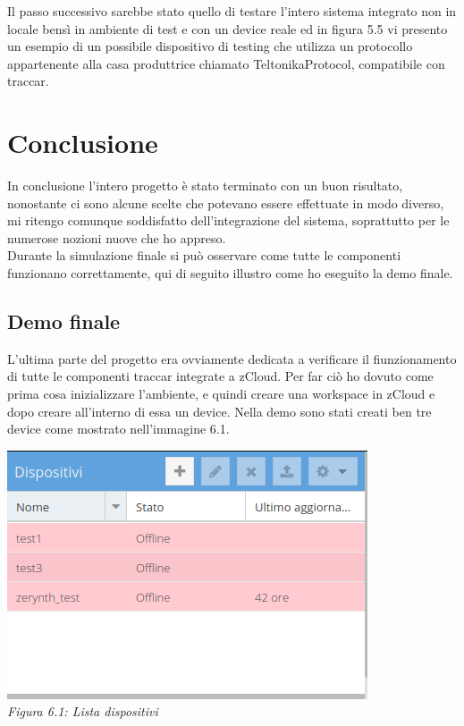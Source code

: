 \documentclass[a4paper,titlepage,12pt]{book}
\begin{document}
Il passo successivo sarebbe stato quello di testare l'intero sistema integrato non in locale bensì in ambiente di test e con un device reale ed in figura 5.5 vi presento un esempio di un possibile dispositivo di testing che utilizza un protocollo appartenente alla casa produttrice chiamato TeltonikaProtocol, compatibile con traccar.\\

\sffamily
\chapter{\sffamily
Conclusione}
In conclusione l'intero progetto è stato terminato con un buon risultato, nonostante ci sono alcune scelte che potevano essere effettuate in modo diverso, mi ritengo comunque soddisfatto dell'integrazione del sistema, soprattutto per le numerose nozioni nuove che ho appreso.\\
Durante la simulazione finale si può osservare come tutte le componenti funzionano correttamente, qui di seguito illustro come ho eseguito la demo finale.

\section{\sffamily
Demo finale}
L'ultima parte del progetto era ovviamente dedicata a verificare il fiunzionamento di tutte le componenti traccar integrate a zCloud. Per far ciò ho dovuto come prima cosa inizializzare l'ambiente, e quindi creare una workspace in zCloud e dopo creare all'interno di essa un device. Nella demo sono stati creati ben tre device come mostrato nell'immagine 6.1.\\



\begin{center}
\includegraphics[scale=0.6]{images/dev.png}\\ 
\textit{Figura 6.1: Lista dispositivi}
\end{center}
\end{document}
